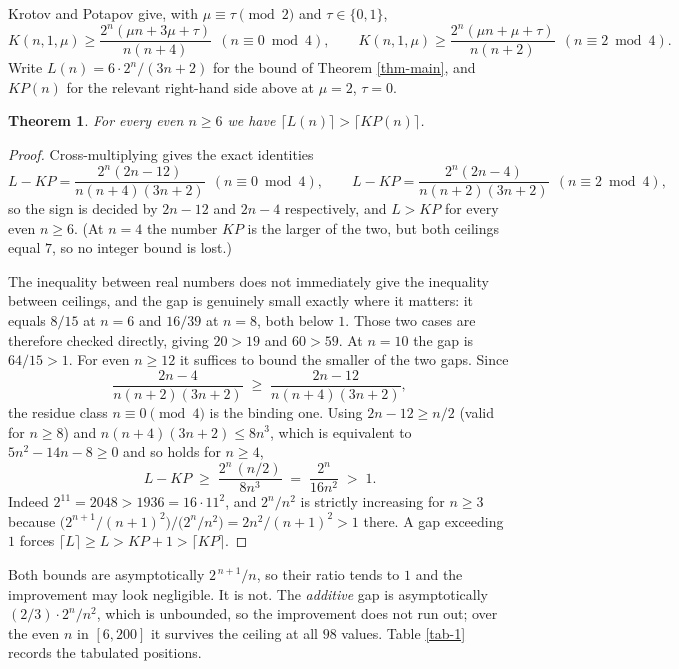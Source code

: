 \documentclass[10pt,a4paper]{article}
\newtheorem{theorem}{Theorem}[section]
\begin{document}
Krotov and Potapov \cite[Theorem 6]{KP-2021} give, with $\mu\equiv\tau\pmod 2$
and $\tau\in\{0,1\}$,
\[
  K(n,1,\mu)\ge\frac{2^n(\mu n+3\mu+\tau)}{n(n+4)}\ \ (n\equiv 0\bmod 4),
  \qquad
  K(n,1,\mu)\ge\frac{2^n(\mu n+\mu+\tau)}{n(n+2)}\ \ (n\equiv 2\bmod 4).
\]
Write $L(n)=6\cdot 2^n/(3n+2)$ for the bound of Theorem \ref{thm-main}, and
$KP(n)$ for the relevant right-hand side above at $\mu=2$, $\tau=0$.

\begin{theorem}\label{thm-dominance}
For every even $n\ge 6$ we have $\lceil L(n)\rceil > \lceil KP(n)\rceil$.
\end{theorem}

\begin{proof}
Cross-multiplying gives the exact identities
\[
  L-KP=\frac{2^n(2n-12)}{n(n+4)(3n+2)}\ \ (n\equiv 0 \bmod 4),
  \qquad
  L-KP=\frac{2^n(2n-4)}{n(n+2)(3n+2)}\ \ (n\equiv 2\bmod 4),
\]
so the sign is decided by $2n-12$ and $2n-4$ respectively, and $L>KP$ for every
even $n\ge 6$. (At $n=4$ the number $KP$ is the larger of the two, but both
ceilings equal $7$, so no integer bound is lost.)

The inequality between real numbers does not immediately give the inequality
between ceilings, and the gap is genuinely small exactly where it matters: it
equals $8/15$ at $n=6$ and $16/39$ at $n=8$, both below $1$. Those two cases are
therefore checked directly, giving $20>19$ and $60>59$. At $n=10$ the gap is
$64/15>1$. For even $n\ge 12$ it suffices to bound the smaller of the two gaps.
Since
\[
  \frac{2n-4}{n(n+2)(3n+2)}\;\ge\;\frac{2n-12}{n(n+4)(3n+2)},
\]
the residue class $n\equiv 0\pmod 4$ is the binding one. Using $2n-12\ge n/2$
(valid for $n\ge 8$) and $n(n+4)(3n+2)\le 8n^3$, which is equivalent to
$5n^2-14n-8\ge 0$ and so holds for $n\ge 4$,
\[
  L-KP \;\ge\; \frac{2^n\,(n/2)}{8n^3} \;=\; \frac{2^n}{16n^2} \;>\; 1 .
\]
Indeed $2^{11}=2048>1936=16\cdot 11^2$, and $2^n/n^2$ is strictly increasing for
$n\ge 3$ because $\bigl(2^{n+1}/(n+1)^2\bigr)\big/\bigl(2^n/n^2\bigr)
=2n^2/(n+1)^2>1$ there. A gap exceeding $1$ forces
$\lceil L\rceil\ge L>KP+1>\lceil KP\rceil$.
\end{proof}

Both bounds are asymptotically $2^{\,n+1}/n$, so their ratio tends to $1$ and
the improvement may look negligible. It is not. The \emph{additive} gap is
asymptotically $(2/3)\cdot 2^n/n^2$, which is unbounded, so the improvement does
not run out; over the even $n$ in $[6,200]$ it survives the ceiling at all $98$
values. Table \ref{tab-1} records the tabulated positions.
\end{document}
